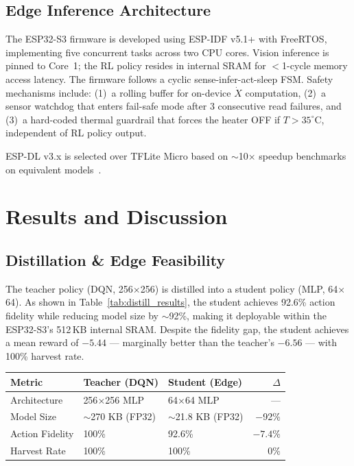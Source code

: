 \documentclass[conference]{IEEEtran}
\begin{document}
\subsection{Edge Inference Architecture}
The ESP32-S3 firmware is developed using ESP-IDF v5.1+ with FreeRTOS, implementing five concurrent tasks across two CPU cores. Vision inference is pinned to Core~1; the RL policy resides in internal SRAM for $<$1-cycle memory access latency. The firmware follows a cyclic sense-infer-act-sleep FSM. Safety mechanisms include: (1)~a rolling buffer for on-device $\dot{X}$ computation, (2)~a sensor watchdog that enters fail-safe mode after 3 consecutive read failures, and (3)~a hard-coded thermal guardrail that forces the heater OFF if $T > 35^{\circ}$C, independent of RL policy output.

ESP-DL v3.x is selected over TFLite Micro based on $\sim$10$\times$ speedup benchmarks on equivalent models~\cite{espdl2024}.

\FloatBarrier
\section{Results and Discussion}
\label{sec:results}

\subsection{Distillation \& Edge Feasibility}

The teacher policy (DQN, 256$\times$256) is distilled into a student policy (MLP, 64$\times$64). As shown in Table~\ref{tab:distill_results}, the student achieves 92.6\% action fidelity while reducing model size by $\sim$92\%, making it deployable within the ESP32-S3's 512\,KB internal SRAM. Despite the fidelity gap, the student achieves a mean reward of $-5.44$ --- marginally better than the teacher's $-6.56$ --- with 100\% harvest rate.

\begin{center}
\small
\begin{tabular}{@{}lllr@{}}
\toprule
\textbf{Metric} & \textbf{Teacher (DQN)} & \textbf{Student (Edge)} & \textbf{$\Delta$} \\
\midrule
Architecture & 256$\times$256 MLP & 64$\times$64 MLP & --- \\
Model Size & $\sim$270 KB (FP32) & $\sim$21.8 KB (FP32) & $-$92\% \\
Action Fidelity & 100\% & 92.6\% & $-7.4$\% \\
Harvest Rate & 100\% & 100\% & 0\% \\
\bottomrule
\end{tabular}
\label{tab:distill_results}
\end{center}
\end{document}
